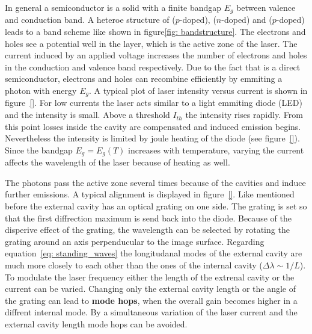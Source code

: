 In general a semiconductor is a solid with a finite bandgap $E_g$ between valence and conduction band. A heteroe structure of  ($p$-doped),
 ($n$-doped)
and  ($p$-doped) leads to a band scheme like shown in figure\ref{fig: bandstructure}. The electrons and holes see a potential well
in the  layer, which is the active zone of the laser. The current induced by an applied voltage increases the number of electrons
and holes in the conduction and valence band respectively. Due to the fact that  is a direct semiconductor, electrons and holes can
recombine efficiently by emmiting a photon with energy $E_g$. A typical plot of laser intensity versus current is shown in figure~\ref{}. For low
currents the laser acts similar to a light emmiting diode (LED) and the intensity is small. Above a threshold $I_{th}$ the intensity rises rapidly.
From this point losses inside the cavity are compensated and induced emission begins. Nevertheless the intensity is limited by joule heating
of the diode (see figure~\ref{}). Since the bandgap $E_g = E_g(T)$ increases with temperature, varying the current affects
the wavelength of the laser because of heating as well.

The photons pass the active zone several times because of the cavities and induce further emissions. A typical alignment is displayed in figure~\ref{}.
Like mentioned before the external cavity has an optical grating on one side. The grating is set so that the first diffrection maximum is send back into the
diode. Because of the disperive effect of the grating, the wavelength can be selected by rotating the grating around an axis perpenducular
to the image surface. Regarding equation~\eqref{eq: standing_waves} the longitudanal modes of the external cavity are much
more closely to each other than the ones of the internal cavity ($\Delta \lambda \sim 1 / L$).
To modulate the laser frequency either the length of the extrenal cavity or the current can be varied.
Changing only the external cavity length or the angle of the grating can lead to \textbf{mode hops}, when the overall gain becomes higher
in a diffrent internal mode. By a simultaneous variation of the laser current and the external cavity length mode hops can be avoided.
